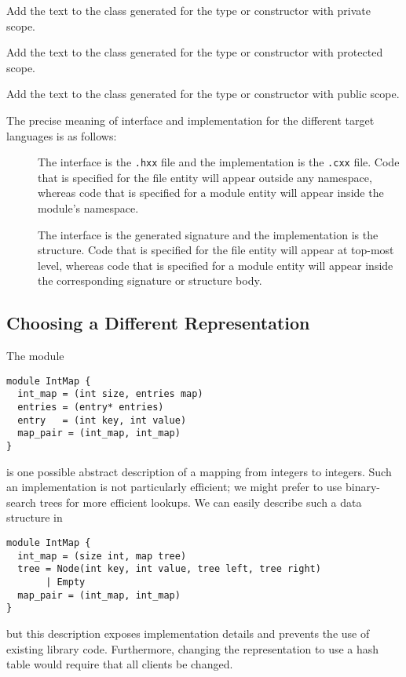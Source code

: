 \begin{description}
    Add the text to the class generated for the type or constructor with private scope.
  
    Add the text to the class generated for the type or constructor with protected scope.
  
     Add the text to the class generated for the type or constructor with public scope.
 
\end{description}%

The precise meaning of interface and implementation for the different
target languages is as follows:
\begin{description}
  \item[\Cplusplus{}]
    The interface is the \texttt{.hxx} file and the implementation is the \texttt{.cxx}
    file.
    Code that is specified for the file entity will appear outside any namespace, whereas
    code that is specified for a module entity will appear inside the module's namespace.
  \item[\sml{}]
    The interface is the generated signature and the implementation is the structure.
    Code that is specified for the file entity will appear at top-most level, whereas code
    that is specified for a module entity will appear inside the corresponding signature
    or structure body.
\end{description}%

\subsection{Choosing a Different Representation}

The \asdl{} module
\begin{code}\begin{lstlisting}[language=ASDL]
module IntMap {
  int_map = (int size, entries map)
  entries = (entry* entries)
  entry   = (int key, int value)
  map_pair = (int_map, int_map)
}
\end{lstlisting}\end{code}%
is one possible abstract description of a mapping from integers to
integers.
Such an implementation is not particularly efficient; we might prefer to
use binary-search trees for more efficient lookups.
We can easily describe such a data structure in \asdl{}
\begin{code}\begin{lstlisting}[language=ASDL]
module IntMap {
  int_map = (size int, map tree)
  tree = Node(int key, int value, tree left, tree right)
       | Empty
  map_pair = (int_map, int_map)
}
\end{lstlisting}\end{code}%
but this description exposes implementation details and prevents the use
of existing library code.  Furthermore, changing the representation
to use a hash table would require that all clients be changed.

